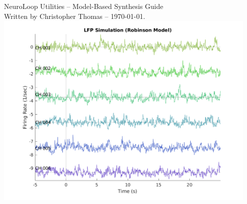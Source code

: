 \documentclass[letterpaper,11pt]{report}
\begin{document}
%
%
\pagestyle{empty}

\begin{center}
%
\vspace*{1in}
{\huge NeuroLoop Utilities -- Model-Based Synthesis Guide} \\
{\footnotesize Written by Christopher Thomas -- \today.}
%
\vspace*{1.5in}\\
\includegraphics[width=5in]{plots/20231205/lfp-simulation-robinson-model}
%
\end{center}
%
\vfill
{\tiny }
%
\clearpage
%
%
%
\pagestyle{plain}
\setcounter{page}{1}
%
\tableofcontents
%
\clearpage
%
%
%
\pagestyle{plain}
\setcounter{page}{1}
%



%
%
\end{document}
